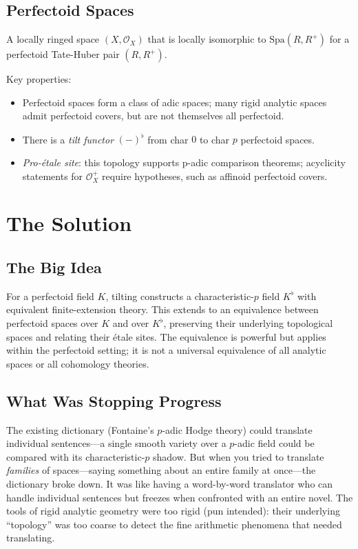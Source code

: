 \subsection{Perfectoid Spaces}
\begin{definition}
A locally ringed space $(X, \mathcal{O}_X)$ that is locally isomorphic to $\text{Spa}(R, R^+)$ for a perfectoid Tate-Huber pair $(R, R^+)$.
\end{definition}

Key properties:
\begin{itemize}
\item Perfectoid spaces form a class of adic spaces; many rigid analytic spaces admit perfectoid covers, but are not themselves all perfectoid.
\item There is a \emph{tilt functor} $(-)^{\flat}$ from char $0$ to char $p$ perfectoid spaces.
\item \emph{Pro-\'etale site}: this topology supports p-adic comparison theorems; acyclicity statements for $\mathcal{O}_X^+$ require hypotheses, such as affinoid perfectoid covers.
\end{itemize}

\section{The Solution}

\subsection{The Big Idea}
For a perfectoid field $K$, tilting constructs a characteristic-$p$ field $K^\flat$ with equivalent finite-extension theory. This extends to an equivalence between perfectoid spaces over $K$ and over $K^\flat$, preserving their underlying topological spaces and relating their étale sites. The equivalence is powerful but applies within the perfectoid setting; it is not a universal equivalence of all analytic spaces or all cohomology theories.

\subsection{What Was Stopping Progress}
The existing dictionary (Fontaine's $p$-adic Hodge theory) could translate individual sentences---a single smooth variety over a $p$-adic field could be compared with its characteristic-$p$ shadow. But when you tried to translate \emph{families} of spaces---saying something about an entire family at once---the dictionary broke down. It was like having a word-by-word translator who can handle individual sentences but freezes when confronted with an entire novel. The tools of rigid analytic geometry were too rigid (pun intended): their underlying ``topology'' was too coarse to detect the fine arithmetic phenomena that needed translating.

